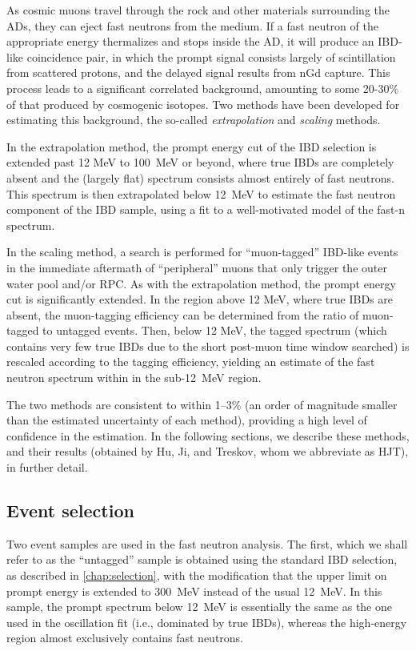 \documentclass[../thesis.tex]{subfiles}
\begin{document}
As cosmic muons travel through the rock and other materials surrounding the ADs,
they can eject fast neutrons from the medium. If a fast neutron of the
appropriate energy thermalizes and stops inside the AD, it will produce an
IBD-like coincidence pair, in which the prompt signal consists largely of
scintillation from scattered protons, and the delayed signal results from nGd
capture. This process leads to a significant correlated background, amounting to
some 20-30\% of that produced by cosmogenic isotopes. Two methods have been
developed for estimating this background, the so-called \emph{extrapolation} and
\emph{scaling} methods.

In the extrapolation method, the prompt energy cut of the IBD selection is
extended past 12 MeV to 100~MeV or beyond, where true IBDs are completely absent
and the (largely flat) spectrum consists almost entirely of fast neutrons. This
spectrum is then extrapolated below 12~MeV to estimate the fast neutron
component of the IBD sample, using a fit to a well-motivated model of the fast-n
spectrum.

In the scaling method, a search is performed for ``muon-tagged'' IBD-like events
in the immediate aftermath of ``peripheral'' muons that only trigger the outer
water pool and/or RPC. As with the extrapolation method, the prompt energy cut
is significantly extended. In the region above 12 MeV, where true IBDs are
absent, the muon-tagging efficiency can be determined from the ratio of
muon-tagged to untagged events. Then, below 12 MeV, the tagged spectrum (which
contains very few true IBDs due to the short post-muon time window searched) is
rescaled according to the tagging efficiency, yielding an estimate of the fast
neutron spectrum within in the sub-12~MeV region.

The two methods are consistent to within 1--3\% (an order of magnitude smaller
than the estimated uncertainty of each method), providing a high level of
confidence in the estimation. In the following sections, we describe these
methods, and their results (obtained by Hu, Ji, and Treskov, whom we abbreviate
as HJT), in further detail.

\subsection{Event selection}
\label{sec:fastn_sel}

Two event samples are used in the fast neutron analysis. The first, which we
shall refer to as the ``untagged'' sample is obtained using the standard IBD
selection, as described in \autoref{chap:selection}, with the modification that
the upper limit on prompt energy is extended to 300~MeV instead of the usual
12~MeV. In this sample, the prompt spectrum below 12~MeV is essentially the same
as the one used in the oscillation fit (i.e., dominated by true IBDs), whereas
the high-energy region almost exclusively contains fast neutrons.
\end{document}
